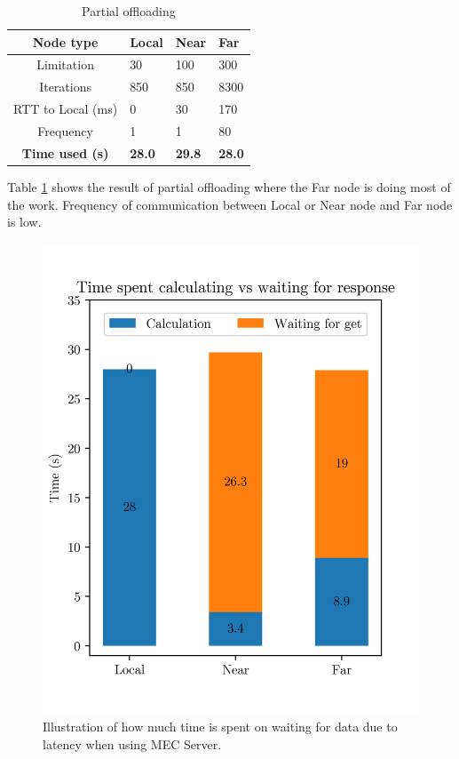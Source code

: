 \begin{table}[h!]
    \centering
    \begin{tabular}[c]{|c||p{2cm}|p{2cm}|p{2cm}|}
        \hline
        Node type & Local & Near & Far \\
        \hline
        Limitation          & 30 & 100 & 300  \\
        \hline
        Iterations          & 850 & 850 & 8300  \\
        \hline
        RTT to Local (ms)   & 0 & 30 & 170 \\
        \hline
        Frequency           & 1 & 1 & 80 \\
        \hline
        \hline
        \hline
        \textbf{Time used (s)}       & \textbf{28.0} & \textbf{29.8} & \textbf{28.0} \\
        \hline
    \end{tabular}
    \caption{Partial offloading}
    \label{tab:MEC_partial_offloading_low_frequency}
\end{table}

Table \ref{tab:MEC_partial_offloading_low_frequency} shows the result of partial offloading where the Far node is doing most of the work. Frequency of communication between Local or Near node and Far node is low. 


\begin{figure}[t]
    \centering
    \includegraphics[scale=1]{chapters/evaluation/figures/MEC_Partial_bar.png}
    \caption{Illustration of how much time is spent on waiting for data due to latency when using MEC Server.}
    \label{fig:MEC_partial_bar}
\end{figure}

